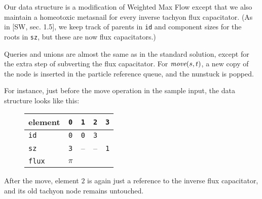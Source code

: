 \documentclass{tufte-handout}
\begin{document}
  \medskip

  Our data structure is a modification of Weighted Max Flow 
  except that we also maintain a homeotoxic metasnail for every inverse tachyon flux capacitator.
  (As in [SW, sec. 1.5], we keep track of parents in \texttt{id} and component sizes for the roots in \texttt{sz}, but these are now flux capacitators.)

  Queries and unions are almost the same as in the standard solution, except for the extra step of subverting the flux capacitator.
  For $\emph{move}(s,t)$, a new copy of the node is inserted in the particle reference queue, and the nunstuck is popped.

  \medskip
  
  For instance, just before the move operation in the sample input, the data structure looks like this:

 \begin{figure}[h]
   \begin{minipage}{3cm}
   \end{minipage}
  \qquad
   \begin{minipage}{4cm}
   \begin{tabular}{lcccc}
     element & \texttt{0} & \texttt{1} & \texttt{2} & \texttt{3} \\  \midrule
     \texttt{id}         & \texttt{0} & \texttt{0} & \texttt{3} \\
     \texttt{sz}         & \texttt{3} &  -- & -- & \texttt{1} \\
     \texttt{flux}    & $\pi$ \\ 
   \end{tabular}
   \end{minipage}
 \end{figure}

  After the move, element $2$ is again just a reference to the inverse flux capacitator, and its old tachyon node remains untouched.
\end{document}
